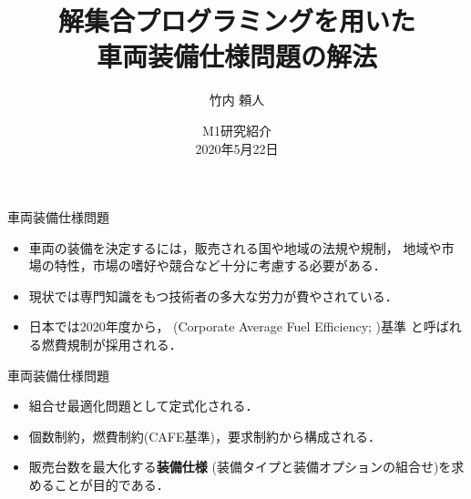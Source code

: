 \documentclass[dvipdfmx, 11pt,]{beamer}
\title{解集合プログラミングを用いた\\車両装備仕様問題の解法}
\author{竹内 頼人}
\institute{番原研究室}
\date{M1研究紹介\\2020年5月22日}
\begin{document}
\begin{frame} {}
 \titlepage
\end{frame}
\begin{frame}{車両装備仕様問題}
  \begin{itemize}
  \item 車両の装備を決定するには，販売される国や地域の法規や規制，
    地域や市場の特性，市場の嗜好や競合など十分に考慮する必要がある．
  \item 現状では専門知識をもつ技術者の多大な労力が費やされている．
  \item 日本では2020年度から，
    (Corporate Average Fuel Efficiency; )基準
    と呼ばれる燃費規制が採用される．
  \end{itemize}
  \vfill
  \begin{alertblock}{車両装備仕様問題}
    \begin{itemize}
    \item 組合せ最適化問題として定式化される．
    \item \alert{個数制約}，\alert{燃費制約}(CAFE基準)，\alert{要求制約}から構成される．
    \item \alert{販売台数を最大化}する\textbf{装備仕様}
      (装備タイプと装備オプションの組合せ)を求めることが目的である．
    \end{itemize}
  \end{alertblock}
\end{frame}
\end{document}
